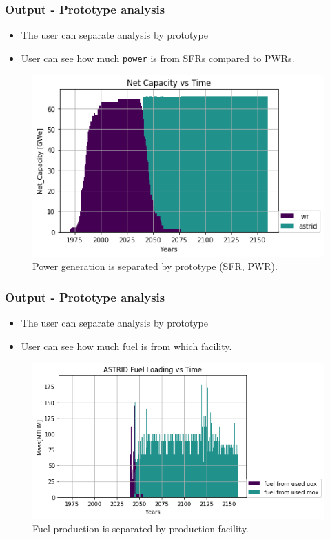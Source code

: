 \begin{frame}
    \frametitle{Output - Prototype analysis}
    \begin{itemize}
        \item The user can separate analysis by prototype
        \item User can see how much \texttt{power} is from SFRs compared to PWRs.
    \end{itemize}
    \begin{figure}[htbp!]
        \begin{center}
                \includegraphics[width=.8\textwidth]{./images/sim_output/france/power_plot.png}
        \end{center}
    \caption{Power generation is separated by prototype (SFR, PWR).}
    \end{figure}
\end{frame}


\begin{frame}
    \frametitle{Output - Prototype analysis}
    \begin{itemize}
        \item The user can separate analysis by prototype
        \item User can see how much fuel is from which facility.
    \end{itemize}
    \begin{figure}[htbp!]
        \begin{center}
                \includegraphics[width=.8\textwidth]{./images/sim_output/france/where_fuel.png}
        \end{center}
    \caption{Fuel production is separated by production facility.}
    \end{figure}
\end{frame}

